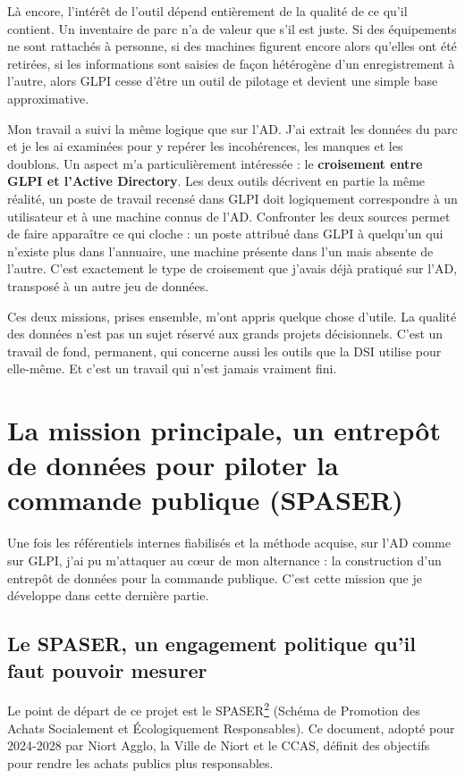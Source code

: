 \documentclass[11pt,a4paper]{article}
\newcommand{\lexref}[1]{\hyperlink{lex:#1}{\textsuperscript{#1}}}
\begin{document}
Là encore, l'intérêt de l'outil dépend entièrement de la qualité de ce qu'il contient. Un inventaire de parc n'a de valeur que s'il est juste. Si des équipements ne sont rattachés à personne, si des machines figurent encore alors qu'elles ont été retirées, si les informations sont saisies de façon hétérogène d'un enregistrement à l'autre, alors GLPI cesse d'être un outil de pilotage et devient une simple base approximative.

Mon travail a suivi la même logique que sur l'AD. J'ai extrait les données du parc et je les ai examinées pour y repérer les incohérences, les manques et les doublons. Un aspect m'a particulièrement intéressée : le \textbf{croisement entre GLPI et l'Active Directory}. Les deux outils décrivent en partie la même réalité, un poste de travail recensé dans GLPI doit logiquement correspondre à un utilisateur et à une machine connus de l'AD. Confronter les deux sources permet de faire apparaître ce qui cloche : un poste attribué dans GLPI à quelqu'un qui n'existe plus dans l'annuaire, une machine présente dans l'un mais absente de l'autre. C'est exactement le type de croisement que j'avais déjà pratiqué sur l'AD, transposé à un autre jeu de données.

Ces deux missions, prises ensemble, m'ont appris quelque chose d'utile. La qualité des données n'est pas un sujet réservé aux grands projets décisionnels. C'est un travail de fond, permanent, qui concerne aussi les outils que la DSI utilise pour elle-même. Et c'est un travail qui n'est jamais vraiment fini.

\section{La mission principale, un entrepôt de données pour piloter la commande publique (SPASER)}
Une fois les référentiels internes fiabilisés et la méthode acquise, sur l'AD comme sur GLPI, j'ai pu m'attaquer au cœur de mon alternance : la construction d'un entrepôt de données pour la commande publique. C'est cette mission que je développe dans cette dernière partie.

\subsection{Le SPASER, un engagement politique qu'il faut pouvoir mesurer}
Le point de départ de ce projet est le SPASER\lexref{2} (Schéma de Promotion des Achats Socialement et Écologiquement Responsables). Ce document, adopté pour 2024-2028 par Niort Agglo, la Ville de Niort et le CCAS, définit des objectifs pour rendre les achats publics plus responsables.
\end{document}
